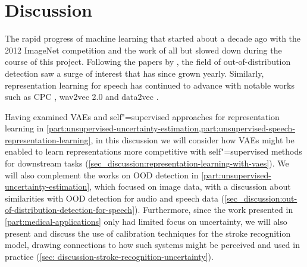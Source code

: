 
\chapter[discussion]{Discussion}\label{chp:discussion}

The rapid progress of machine learning that started about a decade ago with the 2012 ImageNet competition and the work of \textcite{krizhevsky_imagenet_2012} all but slowed down during the course of this project. 
Following the papers by \textcite{choi_waic_2019,nalisnick_detecting_2019,hendrycks_deep_2019}, the field of out-of-distribution detection saw a surge of interest that has since grown yearly. Similarly, representation learning for speech has continued to advance with notable works such as CPC \parencite{oord_representation_2018}, wav2vec 2.0 \parencite{baevski_wav2vec_2020} and data2vec \parencite{baevski_data2vec_2022}. 

Having examined VAEs and self"=supervised approaches for representation learning in \cref{part:unsupervised-uncertainty-estimation,part:unsupervised-speech-representation-learning}, in this discussion we will consider how VAEs might be enabled to learn representations more competitive with self"=supervised methods for downstream tasks (\cref{sec_discussion:representation-learning-with-vaes}). We will also complement the works on OOD detection in \cref{part:unsupervised-uncertainty-estimation}, which focused on image data, with a discussion about similarities with OOD detection for audio and speech data (\cref{sec_discussion:out-of-distribution-detection-for-speech}). 
Furthermore, since the work presented in \cref{part:medical-applications} only had limited focus on uncertainty, we will also present and discuss the use of calibration techniques for the stroke recognition model, drawing connections to how such systems might be perceived and used in practice (\cref{sec: discussion-stroke-recognition-uncertainty}). 

